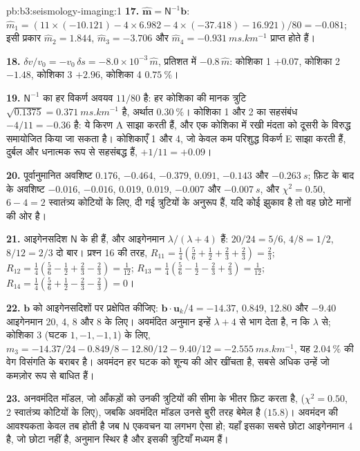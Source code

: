 \begin{solution}{pb:b3:seismology-imaging:1}
\textbf{17.} $\hat{\mathbf m} = \mathsf N^{-1}\mathbf b$:
$\hat m_1 = (11\times(-10.121) - 4\times6.982 - 4\times(-37.418) - 16.921)/80
= -0.081$; इसी प्रकार $\hat m_2 = 1.844$, $\hat m_3 = -3.706$ और
$\hat m_4 = \qty{-0.931}{ms.km^{-1}}$ प्राप्त होते हैं।

\textbf{18.} $\delta v/v_0 = -v_0\,\delta s = -8.0\times10^{-3}\,\hat m$, प्रतिशत में
$-0.8\,\hat m$: कोशिका 1 $+0.07$, कोशिका 2 $-1.48$, कोशिका 3 $+2.96$, कोशिका 4
$\qty{+0.75}{\percent}$।

\textbf{19.} $\mathsf N^{-1}$ का हर विकर्ण अवयव $11/80$ है: हर कोशिका की
मानक त्रुटि $\sqrt{0.1375} = \qty{0.371}{ms.km^{-1}}$ है, अर्थात
$\qty{0.30}{\percent}$। कोशिका 1 और 2 का सहसंबंध $-4/11 = -0.36$ है:
ये किरण A साझा करती हैं, और एक कोशिका में रखी मंदता को दूसरी के विरुद्ध समायोजित किया जा सकता है।
कोशिकाएँ 1 और 4, जो केवल कम परिशुद्ध विकर्ण E साझा करती हैं, दुर्बल और
धनात्मक रूप से सहसंबद्ध हैं, $+1/11 = +0.09$।

\textbf{20.} पूर्वानुमानित अवशिष्ट $0.176$, $-0.464$, $-0.379$, $0.091$,
$-0.143$ और $\qty{-0.263}{s}$; फ़िट के बाद के अवशिष्ट $-0.016$,
$-0.016$, $0.019$, $0.019$, $-0.007$ और $\qty{-0.007}{s}$, और
$\chi^2 = 0.50$, $6 - 4 = 2$ स्वातंत्र्य कोटियों के लिए, दी गई
त्रुटियों के अनुरूप हैं, यदि कोई झुकाव है तो वह छोटे मानों की ओर है।

\textbf{21.} आइगेनसदिश $\mathsf N$ के ही हैं, और आइगेनमान
$\lambda/(\lambda + 4)$ हैं: $20/24 = 5/6$, $4/8 = 1/2$, $8/12 = 2/3$ दो बार।
प्रश्न 16 की तरह, $R_{11} = \tfrac14(\tfrac56 + \tfrac12 + \tfrac23 + \tfrac23) =
\tfrac23$; $R_{12} = \tfrac14(\tfrac56 - \tfrac12 + \tfrac23 - \tfrac23) =
\tfrac1{12}$; $R_{13} = \tfrac14(\tfrac56 - \tfrac12 - \tfrac23 + \tfrac23) =
\tfrac1{12}$; $R_{14} = \tfrac14(\tfrac56 + \tfrac12 - \tfrac23 - \tfrac23) = 0$।

\textbf{22.} $\mathbf b$ को आइगेनसदिशों पर प्रक्षेपित कीजिए: $\mathbf b\cdot\mathbf u_k/4
= -14.37$, $0.849$, $12.80$ और $-9.40$ आइगेनमान 20, 4, 8 और 8 के लिए।
अवमंदित अनुमान इन्हें $\lambda + 4$ से भाग देता है, न कि $\lambda$ से;
कोशिका 3 (घटक $1, -1, -1, 1$) के लिए,
$m_3 = -14.37/24 - 0.849/8 - 12.80/12 - 9.40/12 = \qty{-2.555}{ms.km^{-1}}$,
यह $\qty{+2.04}{\percent}$ की वेग विसंगति के बराबर है। अवमंदन हर घटक को
शून्य की ओर खींचता है, सबसे अधिक उन्हें जो कमज़ोर रूप से बाधित हैं।

\textbf{23.} अनवमंदित मॉडल, जो आँकड़ों को उनकी त्रुटियों की सीमा के भीतर फ़िट करता है,
($\chi^2 = 0.50$, 2 स्वातंत्र्य कोटियों के लिए), जबकि अवमंदित मॉडल उनसे
बुरी तरह बेमेल है ($15.8$)। अवमंदन की आवश्यकता केवल तब होती है जब $\mathsf N$ एकवचन या लगभग
ऐसा हो; यहाँ इसका सबसे छोटा आइगेनमान 4 है, जो छोटा नहीं है, अनुमान स्थिर है और
इसकी त्रुटियाँ मध्यम हैं।


\end{solution}
